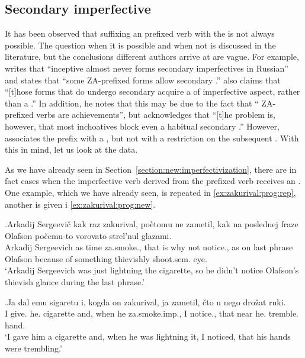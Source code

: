 \subsection{Secondary imperfective}
It has been observed that suffixing an  prefixed verb with the  is not always possible. The question when it is possible and when not is discussed in the literature, but the conclusions different authors arrive at are vague. For example, \citet[230]{Svenonius:04b} writes that ``inceptive  almost never forms secondary imperfectives in Russian'' and \citet[220]{Braginsky:08} states that ``some  ZA-prefixed forms allow secondary .'' \citet[231]{Braginsky:08} also claims that ``[t]hose  forms that do undergo secondary  acquire a  of imperfective aspect, rather than a .'' In addition, he notes that this may be due to the fact that `` ZA-prefixed verbs are achievements'', but acknowledges that ``[t]he problem is, however, that most inchoatives block even a habitual secondary .'' However, \citet{Tatevosov:09} associates the  prefix  with a , but not with a restriction on the subsequent . With this in mind, let us look at the data. 

As we have already seen in Section~\ref{section:new:imperfectivization}, there are in fact cases when the imperfective verb derived from the prefixed  verb receives an . One example, which we have already seen, is repeated in \ref{ex:zakurival:prog:rep}, another is given i \ref{ex:zakurival:prog:new}.

\exg.\label{ex:zakurival:prog:rep}Arkadij Sergeevi\v{c} kak raz zakurival, po\`{e}tomu ne zametil, kak na poslednej fraze Olafson po\v{c}emu-to vorovato strel'nul glazami.\\
Arkadij Sergeevich as time za.smoke., {that is why} not notice., as on last phrase Olafson {because of something} thievishly shoot.sem. eye.\\
\trans `Arkadij Sergeevich was just lightning the cigarette, so he didn't notice Olafson's thievish glance during the last phrase.'

\exg.\label{ex:zakurival:prog:new}Ja dal emu sigaretu i, kogda on zakurival, ja zametil, \v{c}to u nego dro\v{z}at ruki.\\
I give. he. cigarette and, when he za.smoke.imp., I notice., that near he. tremble. hand.\\
\trans `I gave him a cigarette and, when he was lightning it, I noticed, that his hands were trembling.'\\

